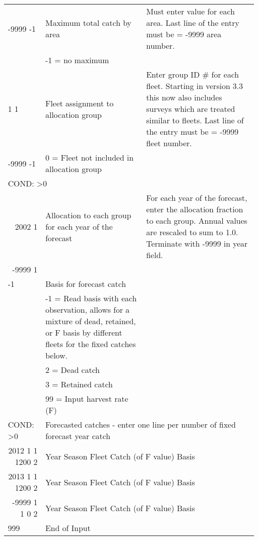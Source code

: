 \begin{landscape}
\begin{longtable}{p{3cm} p{7cm} p{11cm}}
  \hline
  -9999 -1 & Maximum total catch by area & \multirow{1}{1cm}[-0.1cm]{\parbox{11cm}{Must enter value for each area. Last line of the entry must be = -9999 area number.}} \\
     & -1 = no maximum & \\
     
  \hline
  1 1  & Fleet assignment to allocation group & \multirow{1}{1cm}[-0.1cm]{\parbox{11cm}{Enter group ID \# for each fleet. Starting in version 3.3 this now also includes surveys which are treated similar to fleets. Last line of the entry must be = -9999 fleet number.}} \\
  -9999 -1  & 0 = Fleet not included in allocation group & \\
    
  \hline
  \multicolumn{3}{l}{COND: >0 } \\
  \multicolumn{1}{r}{2002 1}  & Allocation to each group for each year of the forecast & For each year of the forecast, enter the allocation fraction to each group. Annual values are rescaled to sum to 1.0. Terminate with -9999 in year field.\\
  \multicolumn{1}{r}{-9999 1} & & \\
  
  
  \pagebreak %

  -1 & Basis for forecast catch & \\
    & -1 = Read basis with each observation, allows for a mixture of dead, retained, or F basis by different fleets for the fixed catches below. & \\
    & 2 = Dead catch & \\
    & 3 = Retained catch & \\
    & 99 = Input harvest rate (F) & \\
    
  \hline
  \multicolumn{1}{l}{COND: >0 }& \multicolumn{2}{l}{Forecasted catches - enter one line per number of fixed forecast year catch }\\
  \multicolumn{1}{r}{2012 1 1 1200 2}  & \multicolumn{2}{l}{Year Season Fleet Catch (of F value) Basis}  \\
  \multicolumn{1}{r}{2013 1 1 1200 2}  & \multicolumn{2}{l}{Year Season Fleet Catch (of F value) Basis}  \\
  \multicolumn{1}{r}{-9999 1 1 0   2}  & \multicolumn{2}{l}{Year Season Fleet Catch (of F value) Basis}  \\
  
  \hline
  999 & End of Input & \\

  \end{longtable}
\end{landscape}
